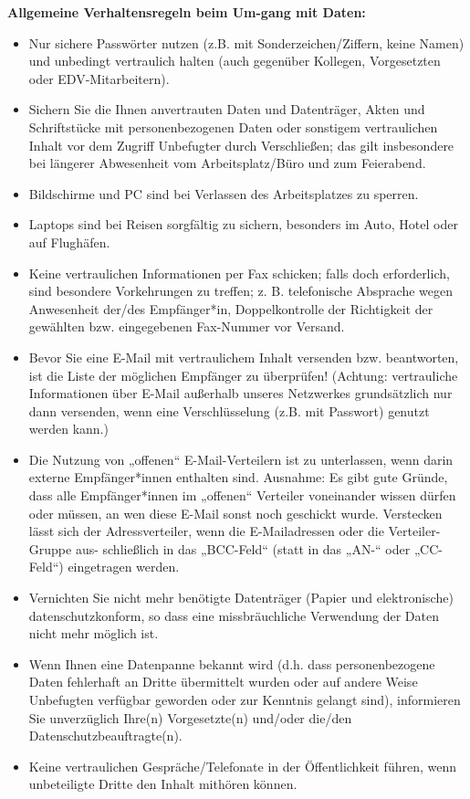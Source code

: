 \documentclass[../Vorlagen/de-RSE_Kopf,a4paper]{scrlttr2}
\begin{document}
\textbf{Allgemeine Verhaltensregeln beim Um-gang mit Daten:} \\
\begin{itemize}
    \item Nur sichere Passwörter nutzen (z.B. mit Sonderzeichen/Ziffern, keine Namen) und unbedingt vertraulich halten (auch gegenüber Kollegen, Vorgesetzten oder EDV-Mitarbeitern).
    \item Sichern Sie die Ihnen anvertrauten Daten und Datenträger, Akten und Schriftstücke mit personenbezogenen Daten oder sonstigem vertraulichen Inhalt vor dem Zugriff Unbefugter durch Verschließen; das gilt insbesondere bei längerer Abwesenheit vom Arbeitsplatz/Büro und zum Feierabend.
    \item Bildschirme und PC sind bei Verlassen des Arbeitsplatzes zu sperren.
    \item Laptops sind bei Reisen sorgfältig zu sichern, besonders im Auto, Hotel oder auf Flughäfen.
    \item Keine vertraulichen Informationen per Fax schicken; falls doch erforderlich, sind besondere Vorkehrungen zu treffen; z. B. telefonische Absprache wegen Anwesenheit der/des Empfänger*in, Doppelkontrolle der Richtigkeit der gewählten bzw. eingegebenen Fax-Nummer vor Versand.
    \item Bevor Sie eine E-Mail mit vertraulichem Inhalt versenden bzw. beantworten, ist die Liste der möglichen Empfänger zu überprüfen! (Achtung: vertrauliche Informationen über E-Mail außerhalb unseres Netzwerkes grundsätzlich nur dann versenden, wenn eine Verschlüsselung (z.B. mit Passwort) genutzt werden kann.)
    \item Die Nutzung von „offenen“ E-Mail-Verteilern ist zu unterlassen, wenn darin externe Empfänger*innen enthalten sind. Ausnahme: Es gibt gute Gründe, dass alle Empfänger*innen im „offenen“ Verteiler voneinander wissen dürfen oder müssen, an wen diese E-Mail sonst noch geschickt wurde. Verstecken lässt sich der Adressverteiler, wenn die E-Mailadressen oder die Verteiler-Gruppe aus- schließlich in das „BCC-Feld“ (statt in das „AN-“ oder „CC-Feld“) eingetragen werden.
    \item Vernichten Sie nicht mehr benötigte Datenträger (Papier und elektronische) datenschutzkonform, so dass eine missbräuchliche Verwendung der Daten nicht mehr möglich ist.
    \item Wenn Ihnen eine Datenpanne bekannt wird (d.h. dass personenbezogene Daten fehlerhaft an Dritte übermittelt wurden oder auf andere Weise Unbefugten verfügbar geworden oder zur Kenntnis gelangt sind), informieren Sie unverzüglich Ihre(n) Vorgesetzte(n) und/oder die/den Datenschutzbeauftragte(n).
    \item Keine vertraulichen Gespräche/Telefonate in der Öffentlichkeit führen, wenn unbeteiligte Dritte den Inhalt mithören können.
\end{itemize}
\end{document}
